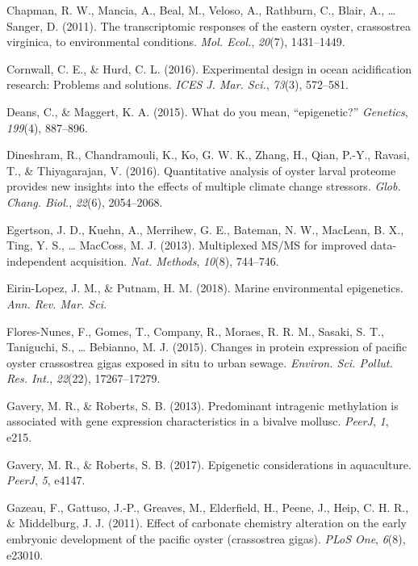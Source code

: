 \documentclass [11pt, proquest] {uwthesis}[2015/03/03]
\newlength{\cslhangindent}
\newenvironment{CSLReferences}%
{\setlength{\parindent}{0pt}%
\everypar{\setlength{\hangindent}{\cslhangindent}}\ignorespaces}%
{\par}
\begin{document}
\begin{CSLReferences}{1}{0}
\leavevmode\hypertarget{ref-Chapman2011}{}%
Chapman, R. W., Mancia, A., Beal, M., Veloso, A., Rathburn, C., Blair, A., \ldots{} Sanger, D. (2011). The transcriptomic responses of the eastern oyster, crassostrea virginica, to environmental conditions. \emph{Mol. Ecol.}, \emph{20}(7), 1431--1449.

\leavevmode\hypertarget{ref-Cornwall2016}{}%
Cornwall, C. E., \& Hurd, C. L. (2016). Experimental design in ocean acidification research: Problems and solutions. \emph{ICES J. Mar. Sci.}, \emph{73}(3), 572--581.

\leavevmode\hypertarget{ref-Deans2015}{}%
Deans, C., \& Maggert, K. A. (2015). What do you mean, {``epigenetic?''} \emph{Genetics}, \emph{199}(4), 887--896.

\leavevmode\hypertarget{ref-Dineshram2016}{}%
Dineshram, R., Chandramouli, K., Ko, G. W. K., Zhang, H., Qian, P.-Y., Ravasi, T., \& Thiyagarajan, V. (2016). Quantitative analysis of oyster larval proteome provides new insights into the effects of multiple climate change stressors. \emph{Glob. Chang. Biol.}, \emph{22}(6), 2054--2068.

\leavevmode\hypertarget{ref-Egertson2013}{}%
Egertson, J. D., Kuehn, A., Merrihew, G. E., Bateman, N. W., MacLean, B. X., Ting, Y. S., \ldots{} MacCoss, M. J. (2013). Multiplexed {MS/MS} for improved data-independent acquisition. \emph{Nat. Methods}, \emph{10}(8), 744--746.

\leavevmode\hypertarget{ref-Eirin-Lopez2018}{}%
Eirin-Lopez, J. M., \& Putnam, H. M. (2018). Marine environmental epigenetics. \emph{Ann. Rev. Mar. Sci.}

\leavevmode\hypertarget{ref-Flores-Nunes2015}{}%
Flores-Nunes, F., Gomes, T., Company, R., Moraes, R. R. M., Sasaki, S. T., Taniguchi, S., \ldots{} Bebianno, M. J. (2015). Changes in protein expression of pacific oyster crassostrea gigas exposed in situ to urban sewage. \emph{Environ. Sci. Pollut. Res. Int.}, \emph{22}(22), 17267--17279.

\leavevmode\hypertarget{ref-Gavery2013}{}%
Gavery, M. R., \& Roberts, S. B. (2013). Predominant intragenic methylation is associated with gene expression characteristics in a bivalve mollusc. \emph{PeerJ}, \emph{1}, e215.

\leavevmode\hypertarget{ref-Gavery2017}{}%
Gavery, M. R., \& Roberts, S. B. (2017). Epigenetic considerations in aquaculture. \emph{PeerJ}, \emph{5}, e4147.

\leavevmode\hypertarget{ref-Gazeau2011}{}%
Gazeau, F., Gattuso, J.-P., Greaves, M., Elderfield, H., Peene, J., Heip, C. H. R., \& Middelburg, J. J. (2011). Effect of carbonate chemistry alteration on the early embryonic development of the pacific oyster (crassostrea gigas). \emph{PLoS One}, \emph{6}(8), e23010.


\end{CSLReferences}
\end{document}
